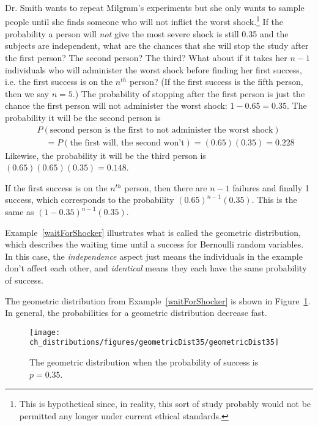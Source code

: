 
\begin{example}{Dr. Smith wants to repeat Milgram's experiments but she only wants to sample people until she finds someone who will not inflict the worst shock.\footnote{This is hypothetical since, in reality, this sort of study probably would not be permitted any longer under current ethical standards.} If the probability a person will \emph{not} give the most severe shock is still 0.35 and the subjects are independent, what are the chances that she will stop the study after the first person? The second person? The third? What about if it takes her $n-1$ individuals who will administer the worst shock before finding her first success, i.e. the first success is on the $n^{th}$ person? (If the first success is the fifth person, then we say $n=5$.)} \label{waitForShocker}
The probability of stopping after the first person is just the chance the first person will not administer the worst shock: $1-0.65=0.35$. The probability it will be the second person is
\begin{eqnarray*}
&&P(\text{second person is the first to not administer the worst shock}) \\
&&\quad = P(\text{the first will, the second won't}) = (0.65)(0.35) = 0.228
\end{eqnarray*}
Likewise, the probability it will be the third person is $(0.65)(0.65)(0.35) = 0.148$.

If the first success is on the $n^{th}$ person, then there are $n-1$ failures and finally 1 success, which corresponds to the probability $(0.65)^{n-1}(0.35)$. This is the same as $(1-0.35)^{n-1}(0.35)$.
\end{example}

Example~\ref{waitForShocker} illustrates what is called the geometric distribution, which describes the waiting time until a success for  Bernoulli random variables. In this case, the \emph{independence} aspect just means the individuals in the example don't affect each other, and \emph{identical} means they each have the same probability of success.

The geometric distribution from Example~\ref{waitForShocker} is shown in Figure~\ref{geometricDist35}. In general, the probabilities for a geometric distribution decrease  fast.

\begin{figure}
\centering
\texttt{[image: ch\_distributions/figures/geometricDist35/geometricDist35]}
\caption{The geometric distribution when the probability of success is $p=0.35$.}
\label{geometricDist35}
\end{figure}

